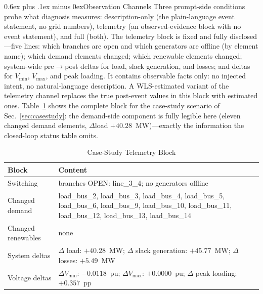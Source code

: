 \documentclass[conference]{IEEEtran}
\makeatletter
\def\subsection{\@startsection{subsection}{2}{\z@}{1.2ex plus 0.2ex minus 0.1ex}%
{0.6ex plus .1ex minus 0ex}{\normalfont\normalsize\itshape}}%
\makeatother
\begin{document}
\subsection{Observation Channels}
Three prompt-side conditions probe what diagnosis measures: description-only (the plain-language event statement, no grid numbers), telemetry (an observed-evidence block with no event statement), and full (both). The telemetry block is fixed and fully disclosed---five lines: which branches are open and which generators are offline (by element name); which demand elements changed; which renewable elements changed; system-wide pre$\to$post deltas for load, slack generation, and losses; and deltas for $V_\mathrm{min}$, $V_\mathrm{max}$, and peak loading. It contains observable facts only: no injected intent, no natural-language description. A WLS-estimated variant of the telemetry channel replaces the true post-event values in this block with estimated ones. Table~\ref{tab:telemetry} shows the complete block for the case-study scenario of Sec.~\ref{sec:casestudy}: the demand-side component is fully legible here (eleven changed demand elements, $\Delta$load $+40.28$~MW)---exactly the information the closed-loop status table omits.

\begin{table}[!t]
\caption{Case-Study Telemetry Block}
\label{tab:telemetry}
\centering
\setlength{\tabcolsep}{3pt}
\fontsize{7}{8}\selectfont
\begin{tabular}{|>{\centering\arraybackslash}p{}|>{\centering\arraybackslash}p{}|}
\hline
\fontsize{8}{9}\selectfont\textbf{Block} & \textbf{Content}\\
\hline
\fontsize{7}{8}\selectfont
Switching & branches OPEN: line\_3\_4; no generators offline\\ \hline
Changed demand & load\_bus\_2, load\_bus\_3, load\_bus\_4, load\_bus\_5, load\_bus\_6, load\_bus\_9, load\_bus\_10, load\_bus\_11, load\_bus\_12, load\_bus\_13, load\_bus\_14\\ \hline
Changed renewables & none\\ \hline
System deltas & $\Delta$ load: $+40.28$~MW; $\Delta$ slack generation: $+45.77$~MW; $\Delta$ losses: $+5.49$~MW\\ \hline
Voltage deltas & $\Delta V_\mathrm{min}$: $-0.0118$~pu; $\Delta V_\mathrm{max}$: $+0.0000$~pu; $\Delta$ peak loading: $+0.357$~pp\\ \hline
\end{tabular}
\end{table}
\end{document}
